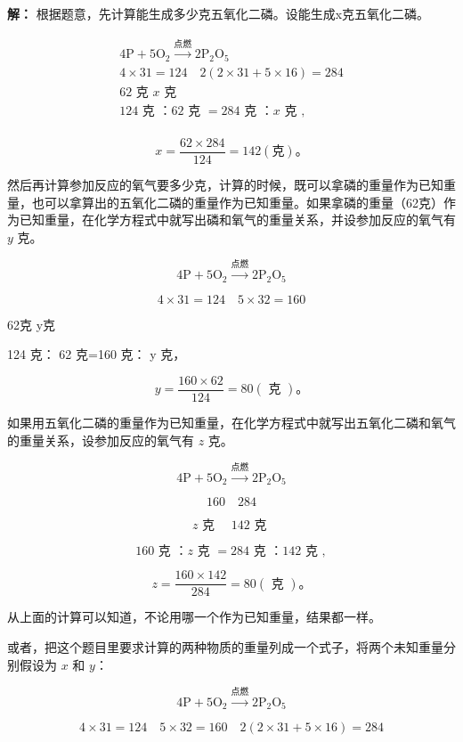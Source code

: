 \textbf{解：}
根据题意，先计算能生成多少克五氧化二磷。设能生成x克五氧化二磷。

\[
\begin{array}{l} 4 \mathrm{P} + 5 \mathrm{O}_{2} \xrightarrow {\text{点燃}} 2 \mathrm{P}_{2} \mathrm{O}_{5} \\ 4 \times 31 = 124 \quad 2 (2 \times 31 + 5 \times 16) = 284 \\ 62 \text{ 克 } x \text{ 克 } \\ 124 \text{ 克 }\text{：} 62 \text{ 克 } = 284 \text{ 克 }\text{：} x \text{ 克 }, \\ \end{array}
\]

\[
x = \frac {62 \times 284}{124} = 142 (\text{克})\text{。}
\]

然后再计算参加反应的氧气要多少克，计算的时候，既可以拿磷的重量作为已知重量，也可以拿算出的五氧化二磷的重量作为已知重量。如果拿磷的重量（62克）作为已知重量，在化学方程式中就写出磷和氧气的重量关系，并设参加反应的氧气有
\(y\) 克。

\[
4 \mathrm{P} + 5 \mathrm{O}_{2} \xrightarrow {\text{点燃}} 2 \mathrm{P}_{2} \mathrm{O}_{5}
\]

\[
4 \times 31 = 124 \quad 5 \times 32 = 160
\]

62克 y克

124 克： 62 克=160 克： y 克，

\[
y = \frac {160 \times 62}{124} = 80 (\text{ 克 })\text{。}
\]

如果用五氧化二磷的重量作为已知重量，在化学方程式中就写出五氧化二磷和氧气的重量关系，设参加反应的氧气有
\(z\) 克。

\[
4 \mathrm{P} + 5 \mathrm{O}_{2} \xrightarrow {\text{点燃}} 2 \mathrm{P}_{2} \mathrm{O}_{5}
\]

\[
160 \quad 284
\]

\[
z \text{ 克 } \quad 142 \text{ 克 }
\]

\[
160 \text{ 克 }\text{：} z \text{ 克 } = 284 \text{ 克 }\text{：} 142 \text{ 克 },
\]

\[
z = \frac {160 \times 142}{284} = 80 (\text{ 克 })\text{。}
\]

从上面的计算可以知道，不论用哪一个作为已知重量，结果都一样。

或者，把这个题目里要求计算的两种物质的重量列成一个式子，将两个未知重量分别假设为
\(x\) 和 \(y\)：

\[
4 \mathrm{P} + 5 \mathrm{O}_{2} \xrightarrow {\text{点燃}} 2 \mathrm{P}_{2} \mathrm{O}_{5}
\]

\[
4 \times 31 = 124 \quad 5 \times 32 = 160 \quad 2 (2 \times 31 + 5 \times 16) = 284
\]

